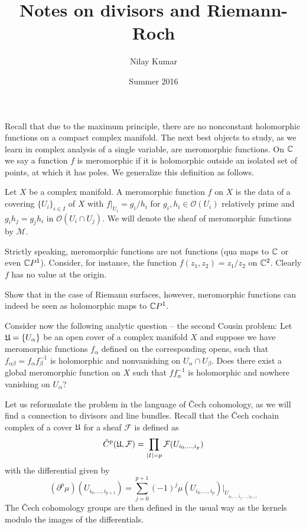 \documentclass{amsart}
\title{Notes on divisors and Riemann-Roch}
\author{Nilay Kumar}
\date{Summer 2016}
\begin{document}
\maketitle

Recall that due to the maximum principle, there are no nonconstant holomorphic functions on a
compact complex manifold. The next best objects to study, as we learn in complex analysis of a single
variable, are meromorphic functions. On $\mathbb{C}$ we say a function $f$ is meromorphic if it is holomorphic
outside an isolated set of points, at which it has poles. We generalize this definition as follows.

\begin{definition}
    Let $X$ be a complex manifold. A {\color{blue}meromorphic function} $f$ on $X$ is the data of a
    covering $\{U_i\}_{i\in I}$ of $X$ with $f|_{U_i}=g_i/h_i$ for $g_i,h_i\in\mathcal{O}(U_i)$
    relatively prime and $g_ih_j=g_jh_i$ in $\mathcal{O}(U_i\cap U_j)$. We will denote the sheaf of
    meromorphic functions by $\mathcal{M}$.
\end{definition}

\begin{remark}
    Strictly speaking, meromorphic functions are not functions (qua maps to $\mathbb{C}$ or even $\mathbb{C} P^1$). Consider,
    for instance, the function $f(z_1,z_2) = z_1/z_2$ on $\mathbb{C}^2$. Clearly $f$ has no value at the origin.
\end{remark}

\begin{exercise}
    Show that in the case of Riemann surfaces, however,  meromorphic functions can indeed be seen as
    holomorphic maps to $\mathbb{C} P^1$.
\end{exercise}

Consider now the following analytic question -- the {\color{blue} second Cousin problem}:
Let $\mathfrak U=\{U_\alpha\}$ be an open cover of a complex manifold $X$ and suppose we have
meromorphic functions $f_\alpha$ defined on the corresponding opens, such that $f_{\alpha\beta}=f_\alpha f_\beta^{-1}$
is holomorphic and nonvanishing on $U_\alpha\cap U_\beta$. Does there exist a global meromorphic function on
$X$ such that $f f_\alpha^{-1}$ is holomorphic and nowhere vanishing on $U_\alpha$?

Let us reformulate the problem in the language of \v Cech cohomology, as we will find a connection
to divisors and line bundles. Recall that the \v Cech cochain complex of a cover $\mathfrak U$ for a sheaf
$\mathcal{F}$ is defined as
\begin{equation*}
    \check C^p(\mathfrak U,\mathcal{F}) =\prod_{|I|=p}\mathcal{F}(U_{i_0,\ldots,i_p})
\end{equation*}
with the differential given by
\begin{equation*}
    (\partial^p\mu)(U_{i_0,\ldots,i_{p+1}}) = \sum_{j=0}^{p+1} (-1)^j\mu(U_{i_0,\ldots,i_p})|_{U_{i_0,\ldots,\hat i_j,\ldots, i_{p+1}}}
\end{equation*}
The \v Cech cohomology groups are then defined in the usual way as the kernels modulo the images of the
differentials.
\end{document}
